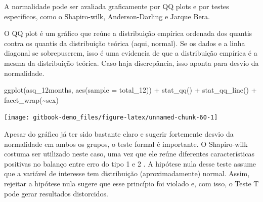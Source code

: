 \documentclass[
]{book}
\newenvironment{Shaded}{\begin{snugshade}}{\end{snugshade}}
\newcommand{\AttributeTok}[1]{\textcolor[rgb]{0.77,0.63,0.00}{#1}}
\newcommand{\FunctionTok}[1]{\textcolor[rgb]{0.00,0.00,0.00}{#1}}
\newcommand{\NormalTok}[1]{#1}
\newcommand{\SpecialCharTok}[1]{\textcolor[rgb]{0.00,0.00,0.00}{#1}}
\begin{document}
A normalidade pode ser avaliada graficamente por QQ plots e por testes específicos, como o Shapiro-wilk, Anderson-Darling e Jarque Bera.

O QQ plot é um gráfico que reúne a distribuição empírica ordenada dos quantis contra os quantis da distribuição teórica (aqui, normal). Se os dados e a linha diagonal se sobrepuserem, isso é uma evidencia de que a distribuição empírica é a mesma da distribuição teórica. Caso haja discrepância, isso aponta para desvio da normalidade.

\begin{Shaded}
\begin{Highlighting}[]
\FunctionTok{ggplot}\NormalTok{(asq\_12months, }\FunctionTok{aes}\NormalTok{(}\AttributeTok{sample =}\NormalTok{ total\_12)) }\SpecialCharTok{+} 
  \FunctionTok{stat\_qq}\NormalTok{() }\SpecialCharTok{+} 
  \FunctionTok{stat\_qq\_line}\NormalTok{() }\SpecialCharTok{+}
  \FunctionTok{facet\_wrap}\NormalTok{(}\SpecialCharTok{\textasciitilde{}}\NormalTok{sex)}
\end{Highlighting}
\end{Shaded}

\begin{center}\texttt{[image: gitbook-demo\_files/figure-latex/unnamed-chunk-60-1]} \end{center}

Apesar do gráfico já ter sido bastante claro e sugerir fortemente desvio da normalidade em ambos os grupos, o teste formal é importante. O Shapiro-wilk costuma ser utilizado neste caso, uma vez que ele reúne diferentes características positivas no balanço entre erro do tipo 1 e 2 \citep{Yap2011}. A hipótese nula desse teste assume que a variável de interesse tem distribuição (aproximadamente) normal. Assim, rejeitar a hipótese nula sugere que esse princípio foi violado e, com isso, o Teste T pode gerar resultados distorcidos.

\begin{Shaded}
\end{Shaded}
\end{document}
